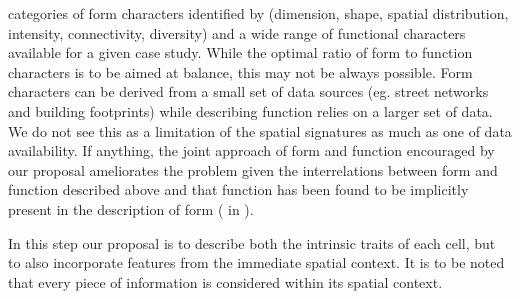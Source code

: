 categories of form characters identified by \cite{fleischmann2020measuring} (dimension,
shape, spatial distribution, intensity, connectivity, diversity) and a wide range of
functional characters available for a given case study. 
%
While the optimal ratio of form to function characters is to be aimed at balance, this may not be
always possible. Form characters can be derived from a small set of data sources (eg.
street networks and building footprints) while describing function relies on a larger set
of data. We do not see this as a limitation of the spatial signatures as much as one
of data availability. If anything, the joint approach of form and function encouraged
by our proposal ameliorates the problem given the interrelations between form and function
described above and that function has been found to be implicitly present in the description of form
(\citealp{caniggia2001architectural} in \citealp{kropf2009aspects}).

In this step our proposal is to describe both the
intrinsic traits of each cell, but to also incorporate features from the immediate
spatial context.
%
It is to be noted that
every piece of information is considered within its spatial context.

